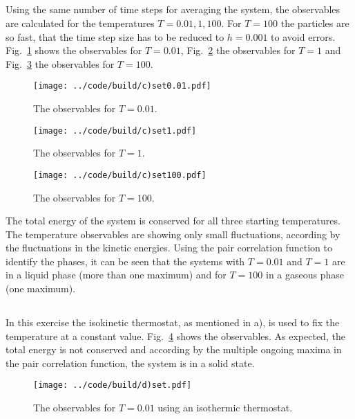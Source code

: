 \subsection{}
Using the same number of time steps for averaging the system, the observables are calculated for the temperatures $T = 0.01, 1, 100$. For $T=100$ the particles are so fast, that the time step size has to be reduced to $h=0.001$ to avoid errors. Fig.~\ref{fig:b_3} shows the observables for $T=0.01$, Fig.~\ref{fig:b_4} the observables for $T=1$  and Fig.~\ref{fig:b_5} the observables for $T=100$.

\begin{figure}[h]
    \centering
    \texttt{[image: ../code/build/c)set0.01.pdf]}
    \caption{The observables for $T=0.01$.}
    \label{fig:b_3}
\end{figure}

\begin{figure}[h]
    \centering
    \texttt{[image: ../code/build/c)set1.pdf]}
    \caption{The observables for $T=1$.}
    \label{fig:b_4}
\end{figure}

\begin{figure}[h]
    \centering
    \texttt{[image: ../code/build/c)set100.pdf]}
    \caption{The observables for $T=100$.}
    \label{fig:b_5}
\end{figure}

\noindent The total energy of the system is conserved for all three starting temperatures. The temperature observables are showing only small fluctuations, according by the fluctuations in the kinetic energies. Using the pair correlation function to identify the phases, it can be seen that the systems with $T=0.01$ and $T=1$ are in a liquid phase (more than one maximum) and for $T=100$ in a gaseous phase (one maximum).


\subsection{}
In this exercise the isokinetic thermostat, as mentioned in a), is used to fix the temperature at a constant value. Fig.~\ref{fig:b_6} shows the observables. As expected, the total energy is not conserved and according by the multiple ongoing maxima in the pair correlation function, the system is in a solid state.

\begin{figure}[h]
    \centering
    \texttt{[image: ../code/build/d)set.pdf]}
    \caption{The observables for $T=0.01$ using an isothermic thermostat.}
    \label{fig:b_6}
\end{figure}


